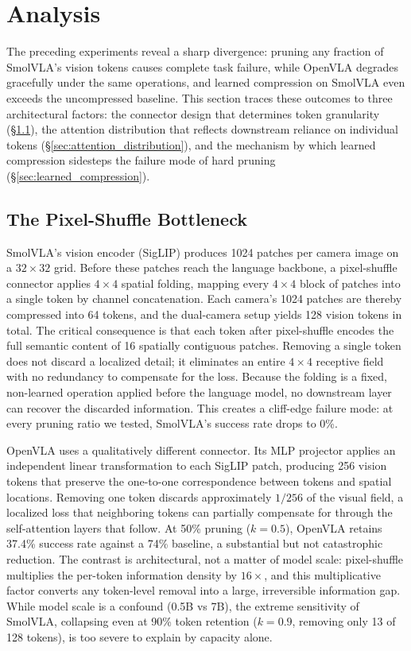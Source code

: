 \section{Analysis}
\label{sec:analysis}

The preceding experiments reveal a sharp divergence: pruning any fraction of SmolVLA's vision tokens causes complete task failure, while OpenVLA degrades gracefully under the same operations, and learned compression on SmolVLA even exceeds the uncompressed baseline. This section traces these outcomes to three architectural factors: the connector design that determines token granularity (\S\ref{sec:pixel_shuffle}), the attention distribution that reflects downstream reliance on individual tokens (\S\ref{sec:attention_distribution}), and the mechanism by which learned compression sidesteps the failure mode of hard pruning (\S\ref{sec:learned_compression}).

\subsection{The Pixel-Shuffle Bottleneck}
\label{sec:pixel_shuffle}

SmolVLA's vision encoder (SigLIP) produces 1024 patches per camera image on a $32 \times 32$ grid. Before these patches reach the language backbone, a pixel-shuffle connector applies $4 \times 4$ spatial folding, mapping every $4 \times 4$ block of patches into a single token by channel concatenation. Each camera's 1024 patches are thereby compressed into 64 tokens, and the dual-camera setup yields 128 vision tokens in total. The critical consequence is that each token after pixel-shuffle encodes the full semantic content of 16 spatially contiguous patches. Removing a single token does not discard a localized detail; it eliminates an entire $4 \times 4$ receptive field with no redundancy to compensate for the loss. Because the folding is a fixed, non-learned operation applied before the language model, no downstream layer can recover the discarded information. This creates a cliff-edge failure mode: at every pruning ratio we tested, SmolVLA's success rate drops to 0\%.

OpenVLA uses a qualitatively different connector. Its MLP projector applies an independent linear transformation to each SigLIP patch, producing 256 vision tokens that preserve the one-to-one correspondence between tokens and spatial locations. Removing one token discards approximately $1/256$ of the visual field, a localized loss that neighboring tokens can partially compensate for through the self-attention layers that follow. At 50\% pruning ($k=0.5$), OpenVLA retains 37.4\% success rate against a 74\% baseline, a substantial but not catastrophic reduction. The contrast is architectural, not a matter of model scale: pixel-shuffle multiplies the per-token information density by $16\times$, and this multiplicative factor converts any token-level removal into a large, irreversible information gap. While model scale is a confound (0.5B vs 7B), the extreme sensitivity of SmolVLA, collapsing even at 90\% token retention ($k=0.9$, removing only 13 of 128 tokens), is too severe to explain by capacity alone.

